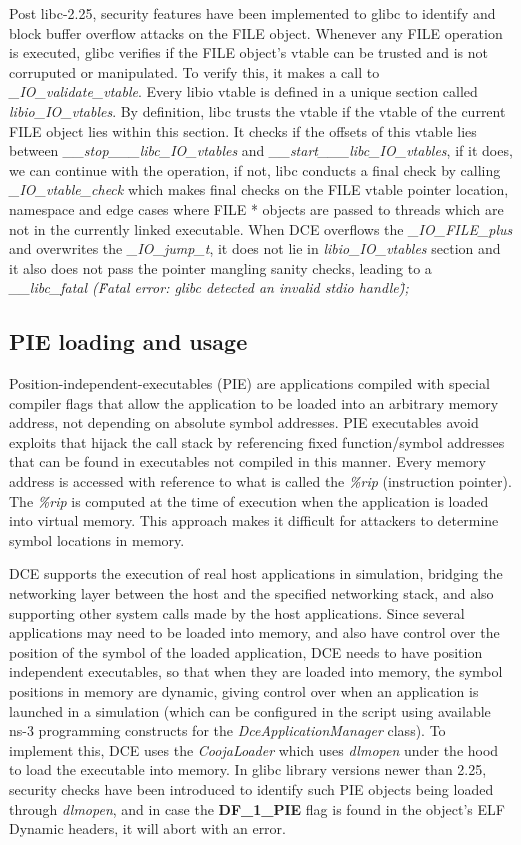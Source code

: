 \documentclass{sig-alternate}
\begin{document}
Post libc-2.25, security features have been implemented to glibc to identify 
and block buffer overflow attacks on the FILE object. Whenever any FILE
operation is executed, glibc 
verifies if the FILE object's vtable can be trusted and is not corruputed or manipulated. To verify this, it makes a call to 
\textit{\_IO\_validate\_vtable}. Every libio vtable is defined in a unique section called \textit{libio\_IO\_vtables}. By definition, libc trusts
the vtable if the vtable of the current FILE object lies within this section. It checks if the offsets of this vtable lies between 
\textit{\_\_stop\_\_\_libc\_IO\_vtables} and \textit{\_\_start\_\_\_libc\_IO\_vtables}, if it does, we can continue with the operation, if not, libc 
conducts a final check by calling \textit{\_IO\_vtable\_check} which makes final checks on the FILE vtable pointer location, namespace and edge cases
where FILE * objects are passed to threads which are not in the currently linked executable.  When DCE overflows the \textit{\_IO\_FILE\_plus} and 
overwrites the \textit{\_IO\_jump\_t}, it does not lie in \textit{libio\_IO\_vtables} section and it also does not pass the pointer mangling sanity checks, leading to a \textit{\_\_libc\_fatal (\"Fatal error: glibc detected an invalid stdio handle\");}

\subsection{PIE loading and usage}
Position-independent-executables (PIE) are applications compiled with special compiler flags that allow the application to be loaded into an arbitrary
memory address, not depending on absolute symbol addresses.  PIE executables
avoid exploits that hijack the call stack by referencing fixed function/symbol addresses that can be found in executables not compiled in this manner.
Every memory address is accessed with reference to what is called the \textit{\%rip} (instruction pointer). The \textit{\%rip} is computed at the time 
of execution when the application is loaded into virtual memory. This approach makes it difficult for attackers to determine symbol locations in memory.

DCE supports the execution of real host applications in simulation, bridging the networking layer between the host and the specified networking stack,
and also supporting other system calls made by the host applications. Since several applications may need to be loaded into memory, and also have control over the
position of the  symbol of the loaded application, DCE needs to have position independent executables, so that when they are loaded into memory,
the symbol positions in memory are dynamic, giving control over when an application is launched in a simulation (which can be configured in the script 
using available ns-3 programming constructs for the \textit{DceApplicationManager} class). To implement this, DCE uses the \textit{CoojaLoader} which 
uses \textit{dlmopen} under the hood to load the executable into memory. In glibc library versions newer than 2.25, security checks have been introduced to identify such 
PIE objects being loaded through \textit{dlmopen}, and in case the \textbf{DF\_1\_PIE} flag is found in the object's ELF Dynamic headers, it will abort with an error.
 
\end{document}
